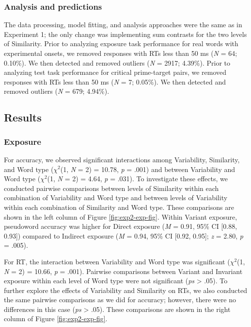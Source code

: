 \documentclass[preprint, 3p, authoryear]{elsarticle} %
\begin{document}
\hypertarget{analysis-and-predictions}{%
\subsubsection{Analysis and predictions}\label{analysis-and-predictions}}

The data processing, model fitting, and analysis approaches were the same as in Experiment 1; the only change was implementing sum contrasts for the two levels of Similarity.
Prior to analyzing exposure task performance for real words with experimental onsets, we removed responses with RTs less than 50 ms (\emph{N} = 64; 0.10\%).
We then detected and removed outliers (\emph{N} = 2917; 4.39\%).
Prior to analyzing test task performance for critical prime-target pairs, we removed responses with RTs less than 50 ms (\emph{N} = 7; 0.05\%).
We then detected and removed outliers (\emph{N} = 679; 4.94\%).

\hypertarget{results-1}{%
\subsection{Results}\label{results-1}}

\hypertarget{exposure-1}{%
\subsubsection{Exposure}\label{exposure-1}}

For accuracy, we observed significant interactions among Variability, Similarity, and Word type (\(\chi^2\)(1, \emph{N} = 2) = 10.78, \emph{p} = .001) and between Variability and Word type (\(\chi^2\)(1, \emph{N} = 2) = 4.64, \emph{p} = .031).
To investigate these effects, we conducted pairwise comparisons between levels of Similarity within each combination of Variability and Word type and between levels of Variability within each combination of Similarity and Word type.
These comparisons are shown in the left column of Figure \ref{fig:exp2-exp-fig}.
Within Variant exposure, pseudoword accuracy was higher for Direct exposure (\emph{M} = 0.91, 95\% CI {[}0.88, 0.93{]}) compared to Indirect exposure (\emph{M} = 0.94, 95\% CI {[}0.92, 0.95{]}; \emph{z} = 2.80, \emph{p} = .005).

For RT, the interaction between Variability and Word type was significant (\(\chi^2\)(1, \emph{N} = 2) = 10.66, \emph{p} = .001).
Pairwise comparisons between Variant and Invariant exposure within each level of Word type were not significant (\emph{ps} \textgreater{} .05).
To further explore the effects of Variability and Similarity on RTs, we also conducted the same pairwise comparisons as we did for accuracy; however, there were no differences in this case (\emph{ps} \textgreater{} .05).
These comparisons are shown in the right column of Figure \ref{fig:exp2-exp-fig}.
\end{document}

